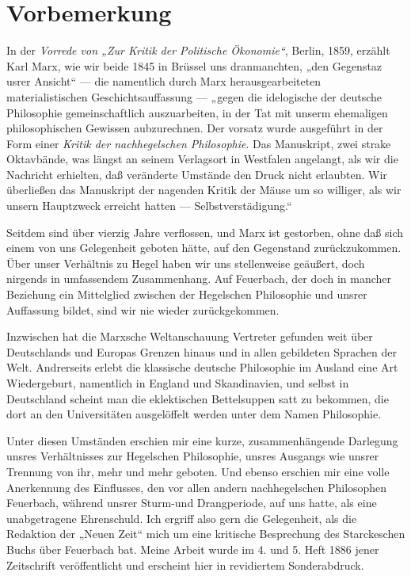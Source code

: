 
{\let\clearpage\relax\chapter*{Vorbemerkung}}


\noindent{}In der \emph{Vorrede von „Zur Kritik der Politische Ökonomie``},
Berlin, 1859, erzählt Karl Marx, wie wir beide 1845 in Brüssel uns
dranmanchten, „den Gegenstaz usrer Ansicht`` --- die namentlich durch
Marx herausgearbeiteten materialistischen Geschichtsauffassung --- „gegen
die idelogische der deutsche Philosophie gemeinschaftlich auszuarbeiten,
in der Tat mit unserm ehemaligen philosophischen Gewissen aubzurechnen.
Der vorsatz wurde ausgeführt in der Form einer \emph{Kritik der
nachhegelschen Philosophie}. Das Manuskript, zwei strake Oktavbände, was
längst an seinem Verlagsort in Westfalen angelangt, als wir die
Nachricht erhielten, daß veränderte Umstände den Druck nicht erlaubten.
Wir überließen das Manuskript der nagenden Kritik der Mäuse um so
williger, als wir unsern Hauptzweck erreicht hatten ---
Selbstverstädigung.``

Seitdem sind über vierzig Jahre verflossen, und Marx ist
gestorben, ohne daß sich einem von uns Gelegenheit geboten hätte, auf
den Gegenstand zurückzukommen. Über unser Verhältnis zu Hegel haben wir
uns stellenweise geäußert, doch nirgends in umfassendem Zusammenhang.
Auf Feuerbach, der doch in mancher Beziehung ein Mittelglied zwischen
der Hegelschen Philosophie und unsrer Auffassung bildet, sind wir nie
wieder zurückgekommen.

Inzwischen hat die Marxsche Weltanschauung Vertreter gefunden
weit über Deutschlands und Europas Grenzen hinaus und in allen
gebildeten Sprachen der Welt. Andrerseits erlebt die klassische deutsche
Philosophie im Ausland eine Art Wiedergeburt, namentlich in England und
Skandinavien, und selbst in Deutschland scheint man die eklektischen
Bettelsuppen satt zu bekommen, die dort an den Universitäten ausgelöffelt werden unter dem Namen Philosophie.

Unter diesen Umständen erschien mir eine kurze, zusammenhängende
Darlegung unsres Verhältnisses zur Hegelschen Philosophie, unsres
Ausgangs wie unsrer Trennung von ihr, mehr und mehr geboten. Und ebenso
erschien mir eine volle Anerkennung des Einflusses, den vor allen andern
nachhegelschen Philosophen Feuerbach, während unsrer Sturm-und
Drangperiode, auf uns hatte, als eine unabgetragene Ehrenschuld. Ich
ergriff also gern die Gelegenheit, als die Redaktion der „Neuen Zeit``
mich um eine kritische Besprechung des Starckeschen Buchs über Feuerbach
bat. Meine Arbeit wurde im 4. und 5. Heft 1886 jener Zeitschrift
veröffentlicht und erscheint hier in revidiertem Sonderabdruck.

